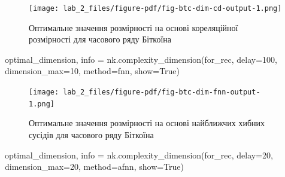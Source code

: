 \documentclass[
  letterpaper,
]{report}
\newenvironment{Shaded}{\begin{snugshade}}{\end{snugshade}}
\newcommand{\DecValTok}[1]{\textcolor[rgb]{0.68,0.00,0.00}{#1}}
\newcommand{\NormalTok}[1]{\textcolor[rgb]{0.00,0.23,0.31}{#1}}
\newcommand{\OperatorTok}[1]{\textcolor[rgb]{0.37,0.37,0.37}{#1}}
\newcommand{\StringTok}[1]{\textcolor[rgb]{0.13,0.47,0.30}{#1}}
\newcommand{\VariableTok}[1]{\textcolor[rgb]{0.07,0.07,0.07}{#1}}
\begin{document}
\begin{figure}[H]

{\centering \texttt{[image: lab\_2\_files/figure-pdf/fig-btc-dim-cd-output-1.png]}

}

\caption{\label{fig-btc-dim-cd}Оптимальне значення розмірності на основі
кореляційної розмірності для часового ряду Біткоїна}

\end{figure}

\begin{Shaded}
\begin{Highlighting}[]
\NormalTok{optimal\_dimension, info }\OperatorTok{=}\NormalTok{ nk.complexity\_dimension(for\_rec,}
\NormalTok{                                                  delay}\OperatorTok{=}\DecValTok{100}\NormalTok{,}
\NormalTok{                                                  dimension\_max}\OperatorTok{=}\DecValTok{10}\NormalTok{,}
\NormalTok{                                                  method}\OperatorTok{=}\StringTok{\textquotesingle{}fnn\textquotesingle{}}\NormalTok{,}
\NormalTok{                                                  show}\OperatorTok{=}\VariableTok{True}\NormalTok{)}
\end{Highlighting}
\end{Shaded}

\begin{figure}[H]

{\centering \texttt{[image: lab\_2\_files/figure-pdf/fig-btc-dim-fnn-output-1.png]}

}

\caption{\label{fig-btc-dim-fnn}Оптимальне значення розмірності на
основі найближчих хибних сусідів для часового ряду Біткоїна}

\end{figure}

\begin{Shaded}
\begin{Highlighting}[]
\NormalTok{optimal\_dimension, info }\OperatorTok{=}\NormalTok{ nk.complexity\_dimension(for\_rec,}
\NormalTok{                                                  delay}\OperatorTok{=}\DecValTok{20}\NormalTok{,}
\NormalTok{                                                  dimension\_max}\OperatorTok{=}\DecValTok{20}\NormalTok{,}
\NormalTok{                                                  method}\OperatorTok{=}\StringTok{\textquotesingle{}afnn\textquotesingle{}}\NormalTok{,}
\NormalTok{                                                  show}\OperatorTok{=}\VariableTok{True}\NormalTok{)}
\end{Highlighting}
\end{Shaded}
\end{document}
